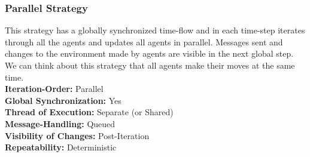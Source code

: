 \subsubsection{Parallel Strategy}
This strategy has a globally synchronized time-flow and in each time-step iterates through all the agents and updates all agents in parallel. Messages sent and changes to the environment made by agents are visible in the next global step. We can think about this strategy that all agents make their moves at the same time. \\

\textbf{Iteration-Order:} Parallel \\
\textbf{Global Synchronization:} Yes \\
\textbf{Thread of Execution:} Separate (or Shared) \\
\textbf{Message-Handling:} Queued \\
\textbf{Visibility of Changes:}	Post-Iteration \\
\textbf{Repeatability:}	Deterministic 

